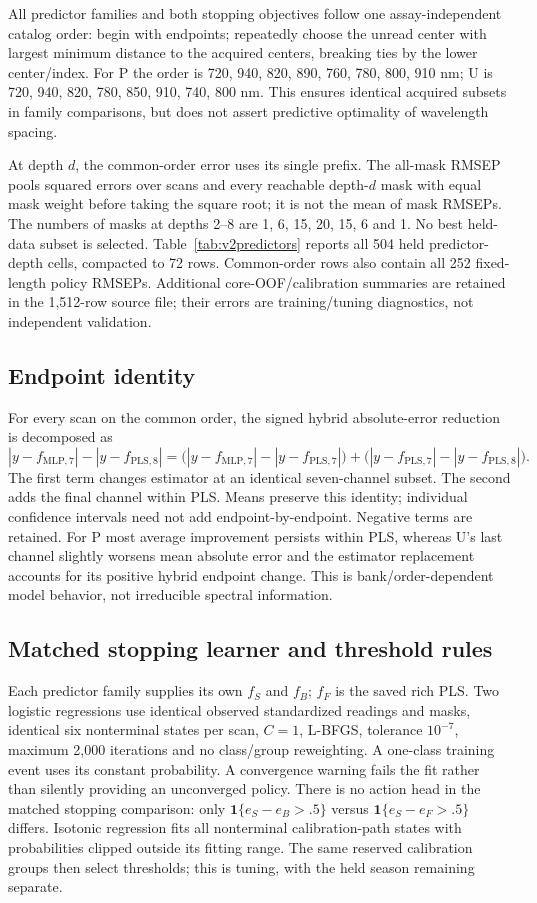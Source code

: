 \documentclass[10pt,a4paper]{article}
\begin{document}
All predictor families and both stopping objectives follow one assay-independent catalog order: begin with endpoints; repeatedly choose the unread center with largest minimum distance to the acquired centers, breaking ties by the lower center/index. For P the order is 720, 940, 820, 890, 760, 780, 800, 910 nm; U is 720, 940, 820, 780, 850, 910, 740, 800 nm. This ensures identical acquired subsets in family comparisons, but does not assert predictive optimality of wavelength spacing.

At depth $d$, the common-order error uses its single prefix. The all-mask RMSEP pools squared errors over scans and every reachable depth-$d$ mask with equal mask weight before taking the square root; it is not the mean of mask RMSEPs. The numbers of masks at depths 2--8 are 1, 6, 15, 20, 15, 6 and 1. No best held-data subset is selected. Table~\ref{tab:v2predictors} reports all 504 held predictor-depth cells, compacted to 72 rows. Common-order rows also contain all 252 fixed-length policy RMSEPs. Additional core-OOF/calibration summaries are retained in the 1,512-row source file; their errors are training/tuning diagnostics, not independent validation.

\subsection{Endpoint identity}
For every scan on the common order, the signed hybrid absolute-error reduction is decomposed as
\[
 |y-f_{\mathrm{MLP},7}|-|y-f_{\mathrm{PLS},8}|
 =\bigl(|y-f_{\mathrm{MLP},7}|-|y-f_{\mathrm{PLS},7}|\bigr)
 +\bigl(|y-f_{\mathrm{PLS},7}|-|y-f_{\mathrm{PLS},8}|\bigr).
\]
The first term changes estimator at an identical seven-channel subset. The second adds the final channel within PLS. Means preserve this identity; individual confidence intervals need not add endpoint-by-endpoint. Negative terms are retained. For P most average improvement persists within PLS, whereas U's last channel slightly worsens mean absolute error and the estimator replacement accounts for its positive hybrid endpoint change. This is bank/order-dependent model behavior, not irreducible spectral information.

\subsection{Matched stopping learner and threshold rules}
Each predictor family supplies its own $f_S$ and $f_B$; $f_F$ is the saved rich PLS. Two logistic regressions use identical observed standardized readings and masks, identical six nonterminal states per scan, $C=1$, L-BFGS, tolerance $10^{-7}$, maximum 2,000 iterations and no class/group reweighting. A one-class training event uses its constant probability. A convergence warning fails the fit rather than silently providing an unconverged policy. There is no action head in the matched stopping comparison: only $\mathbf{1}\{e_S-e_B>.5\}$ versus $\mathbf{1}\{e_S-e_F>.5\}$ differs. Isotonic regression fits all nonterminal calibration-path states with probabilities clipped outside its fitting range. The same reserved calibration groups then select thresholds; this is tuning, with the held season remaining separate.
\end{document}
